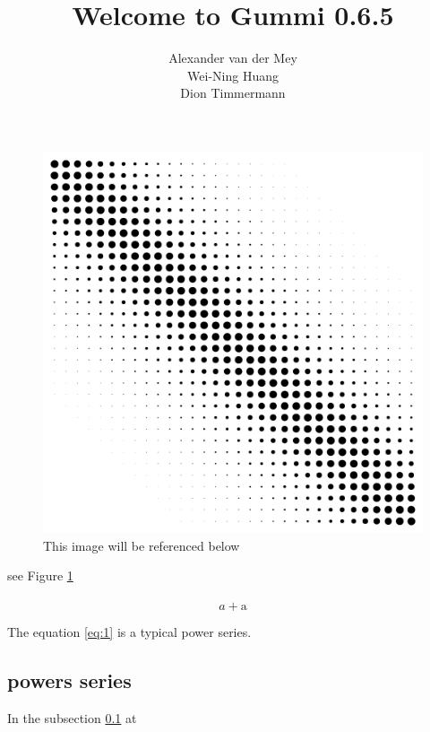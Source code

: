\documentclass[11pt]{article}
\title{\textbf{Welcome to Gummi 0.6.5}}
\author{Alexander van der Mey\\
		Wei-Ning Huang\\
		Dion Timmermann}
\date{}
\begin{document}
\begin{figure}[h]
\centering
\includegraphics[width=0.5\linewidth]{test.png}
\caption{This image will be referenced below}
\label{fig:lion}
\end{figure}
see Figure \ref{fig:lion}\\\\



\begin{equation} \label{eq:1}
		a+ \text{a}
\end{equation}



 The equation \ref{eq:1} is a typical power series.
 
  
\subsection{powers series} \label{subsection}

In the subsection \ref{subsection} at
\end{document}

